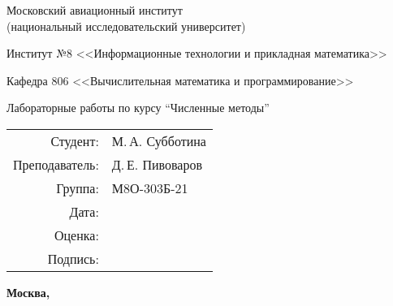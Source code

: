 \begin{titlepage}
\begin{center}
\bfseries

{\Large Московский авиационный институт\\ (национальный исследовательский университет)

}

\vspace{48pt}

{\large Институт №8 <<Информационные технологии и прикладная математика>>
}

\vspace{36pt}

{\large Кафедра 806 <<Вычислительная математика и программирование>>

}


\vspace{48pt}

Лабораторные работы по курсу \enquote{Численные методы}

\end{center}

\vspace{72pt}

\begin{flushright}
\begin{tabular}{rl}
Студент: & М.\,А. Субботина \\
Преподаватель: & Д.\,Е. Пивоваров \\
Группа: & М8О-303Б-21 \\
Дата: & \\
Оценка: & \\
Подпись: & \\
\end{tabular}
\end{flushright}

\vfill

\begin{center}
\bfseries
Москва, \the\year
\end{center}
\end{titlepage}

\pagebreak
